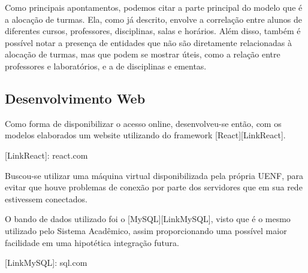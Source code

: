     Como principais apontamentos, podemos citar a parte principal do modelo que é a alocação de turmas. Ela, como já descrito, envolve a correlação entre alunos de diferentes cursos, professores, disciplinas, salas e horários. Além disso, também é possível notar a presença de entidades que não são diretamente relacionadas à alocação de turmas, mas que podem se mostrar úteis, como a relação entre professores e laboratórios, e a de disciplinas e ementas.

\subsection{Desenvolvimento Web} %

    Como forma de disponibilizar o acesso online, desenvolveu-se então, com os modelos elaborados um website utilizando do framework [React][LinkReact].

    [LinkReact]: react.com

    Buscou-se utilizar uma máquina virtual disponibilizada pela própria UENF, para evitar que houve problemas de conexão por parte dos servidores que em sua rede estivessem conectados.

    O bando de dados utilizado foi o [MySQL][LinkMySQL], visto que é o mesmo utilizado pelo Sistema Acadêmico, assim proporcionando uma possível maior facilidade em uma hipotética integração futura.

    [LinkMySQL]: sql.com
